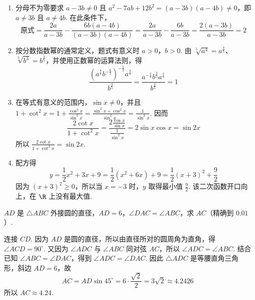 \begin{solution}
\begin{enumerate}
    \item 分母不为零要求
    \(a-3b\ne0\) 且
    \(a^2-7ab+12b^2=(a-3b)(a-4b)\ne0\)，即 \(a\ne3b\) 且 \(a\ne4b\). 在此条件下，
    \[
    \text{原式}=\frac{2a}{a-3b}-\frac{6b(a-4b)}{(a-3b)(a-4b)}
    =\frac{2a}{a-3b}-\frac{6b}{a-3b}
    =\frac{2(a-3b)}{a-3b}=2
    \]

    \item 按分数指数幂的通常定义，题式有意义时 \(a>0\)，\(b>0\). 由
    \(\sqrt[5]{a^4}=a^{\frac45}\)、\(\sqrt[5]{b^3}=b^{\frac35}\)，并使用正数幂的运算法则，得
    \[
    \frac{\left( a^{\frac85}b^{-\frac65} \right)^{-\frac12}a^{\frac45}}{b^{\frac35}}
    =\frac{a^{-\frac45}b^{\frac35}a^{\frac45}}{b^{\frac35}}=1
    \]

    \item 在等式有意义的范围内，\(\sin x\ne0\)，并且
    \(1+\cot^2x=1+\frac{\cos^2x}{\sin^2x}=\frac{\sin^2x+\cos^2x}{\sin^2x}=\frac{1}{\sin^2x}\). 因而
    \[
    \frac{2\cot x}{1+\cot^2x}
    =\frac{2\frac{\cos x}{\sin x}}{\frac{1}{\sin^2x}}
    =2\sin x\cos x=\sin2x
    \]
    所以 \(\frac{2\cot x}{1+\cot^2x}=\sin2x\).

    \item 配方得
    \[
    y=\frac12x^2+3x+9=\frac12\left(x^2+6x\right)+9=\frac12\left(x+3\right)^2+\frac92
    \]
    因为 \(\left(x+3\right)^2\geqslant0\)，所以当 \(x=-3\) 时，\(y\) 取得最小值 \(\frac92\). 该二次函数开口向上，在 \(\R\) 上没有最大值.
\end{enumerate}
\end{solution}


\begin{problem}
\(AD\) 是 \( \triangle ABC \) 外接圆的直径，\( AD=6 \)，\( \angle DAC=\angle ABC \)，求 \(AC\)（精确到 \(0.01\)）.

\end{problem}

\begin{solution}
连接 \(CD\). 因为 \(AD\) 是圆的直径，所以由直径所对的圆周角为直角，得 \(\angle ACD=90^\circ\). 又因为 \(\angle ADC\) 与 \(\angle ABC\) 同对弦 \(AC\)，所以 \(\angle ADC=\angle ABC\). 结合已知 \(\angle ABC=\angle DAC\)，得到 \(\angle ADC=\angle DAC\). 因此 \(\triangle ADC\) 是等腰直角三角形，斜边 \(AD=6\)，故
\[
AC=AD\sin45^\circ=6\cdot\frac{\sqrt2}{2}=3\sqrt2\approx4.2426
\]
所以 \(AC\approx4.24\).
\end{solution}


